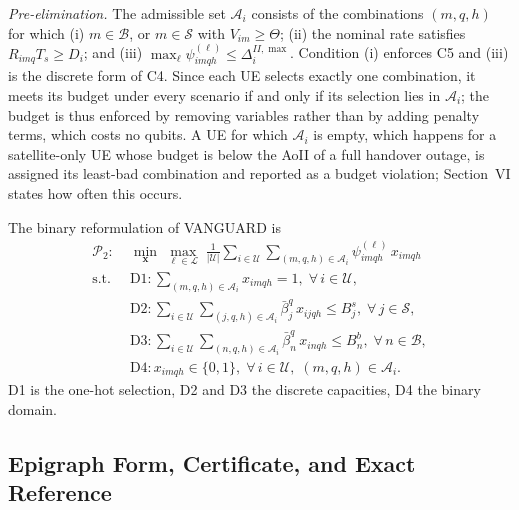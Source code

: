 \emph{Pre-elimination.} The admissible set $\mathscr{A}_i$ consists of the combinations $(m,q,h)$ for which (i)
$m\in\mathscr{B}$, or $m\in\mathscr{S}$ with $V_{im}\geq\Theta$; (ii) the nominal rate satisfies
$R_{imq}T_s\geq D_i$; and (iii) $\max_{\ell}\psi^{(\ell)}_{imqh}\leq\Delta_i^{II,\max}$. Condition (i) enforces C5
and (iii) is the discrete form of C4. Since each UE selects exactly one combination, it meets its budget under every
scenario if and only if its selection lies in $\mathscr{A}_i$; the budget is thus enforced by removing variables
rather than by adding penalty terms, which costs no qubits. A UE for which $\mathscr{A}_i$ is empty, which happens for
a satellite-only UE whose budget is below the AoII of a full handover outage, is assigned its least-bad combination and
reported as a budget violation; Section~VI states how often this occurs.

The binary reformulation of VANGUARD is
\begin{align}
    \mathscr{P}_{2}:\;&\min_{\mathbf{x}}\;\max_{\ell\in\mathscr{L}}\;
    \frac{1}{|\mathscr{U}|}\sum_{i\in\mathscr{U}}\sum_{(m,q,h)\in\mathscr{A}_i}\psi_{imqh}^{(\ell)}\,x_{imqh}
    \nonumber\\
    \text{s.t.}\;\;
    &\text{D1}:\sum_{(m,q,h)\in\mathscr{A}_i}x_{imqh}=1,\;\forall\,i\in\mathscr{U},
    \nonumber\\
    &\text{D2}:\sum_{i\in\mathscr{U}}\sum_{(j,q,h)\in\mathscr{A}_i}\bar{\beta}^{q}_{j}\,x_{ijqh}\leq B^{s}_{j},
    \;\forall\,j\in\mathscr{S},
    \nonumber\\
    &\text{D3}:\sum_{i\in\mathscr{U}}\sum_{(n,q,h)\in\mathscr{A}_i}\bar{\beta}^{q}_{n}\,x_{inqh}\leq B^{b}_{n},
    \;\forall\,n\in\mathscr{B},
    \nonumber\\
    &\text{D4}:x_{imqh}\in\{0,1\},\;\forall\,i\in\mathscr{U},\;(m,q,h)\in\mathscr{A}_i.
    \nonumber
\end{align}
D1 is the one-hot selection, D2 and D3 the discrete capacities, D4 the binary domain.

\subsection{Epigraph Form, Certificate, and Exact Reference}

